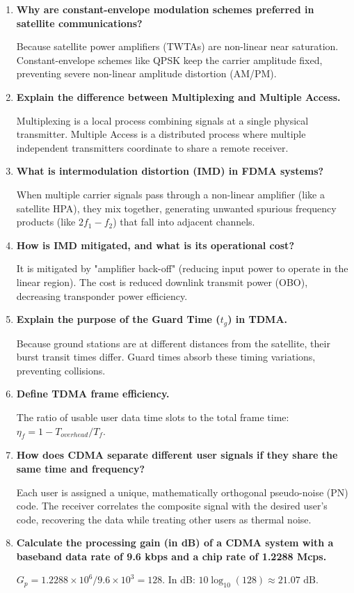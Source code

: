 \documentclass[12pt,a4paper]{article}
\newcommand{\Q}[1]{\textbf{#1}\par\noindent\ignorespaces}
\begin{document}
\begin{tcolorbox}[exambox, title={\textbf{Frequently Asked / Viva Questions}}]
\begin{enumerate}[topsep=0pt, label=\textbf{Q\arabic*.}, itemsep=5pt]
  \item \Q{Why are constant-envelope modulation schemes preferred in satellite communications?}
    Because satellite power amplifiers (TWTAs) are non-linear near saturation. Constant-envelope schemes like QPSK keep the carrier amplitude fixed, preventing severe non-linear amplitude distortion (AM/PM).
  \item \Q{Explain the difference between Multiplexing and Multiple Access.}
    Multiplexing is a local process combining signals at a single physical transmitter. Multiple Access is a distributed process where multiple independent transmitters coordinate to share a remote receiver.
  \item \Q{What is intermodulation distortion (IMD) in FDMA systems?}
    When multiple carrier signals pass through a non-linear amplifier (like a satellite HPA), they mix together, generating unwanted spurious frequency products (like $2f_1 - f_2$) that fall into adjacent channels.
  \item \Q{How is IMD mitigated, and what is its operational cost?}
    It is mitigated by "amplifier back-off" (reducing input power to operate in the linear region). The cost is reduced downlink transmit power (OBO), decreasing transponder power efficiency.
  \item \Q{Explain the purpose of the Guard Time ($t_g$) in TDMA.}
    Because ground stations are at different distances from the satellite, their burst transit times differ. Guard times absorb these timing variations, preventing collisions.
  \item \Q{Define TDMA frame efficiency.}
    The ratio of usable user data time slots to the total frame time: $\eta_f = 1 - T_{overhead}/T_f$.
  \item \Q{How does CDMA separate different user signals if they share the same time and frequency?}
    Each user is assigned a unique, mathematically orthogonal pseudo-noise (PN) code. The receiver correlates the composite signal with the desired user's code, recovering the data while treating other users as thermal noise.
  \item \Q{Calculate the processing gain (in dB) of a CDMA system with a baseband data rate of 9.6 kbps and a chip rate of 1.2288 Mcps.}
    $G_p = 1.2288 \times 10^6 / 9.6 \times 10^3 = 128$. In dB: $10\log_{10}(128) \approx 21.07 \text{ dB}$.

\end{enumerate}
\end{tcolorbox}
\end{document}
